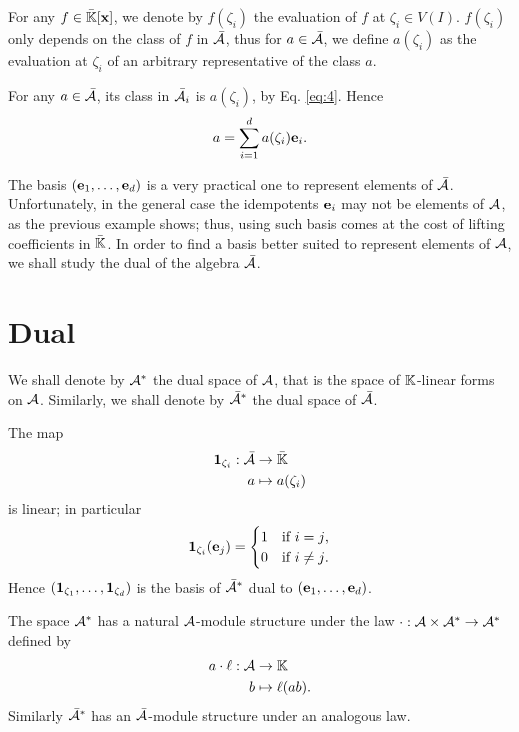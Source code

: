 For any $f\in\bar{\mathbb{K}}[\mathbf{x}]$, we denote by $f(\zeta_i)$ the
evaluation of $f$ at $\zeta_i\in V(I)$. $f(\zeta_i)$ only depends on
the class of $f$ in $\mathcal{\bar{A}}$, thus for
$a\in\bar{\mathcal{A}}$, we define $a(\zeta_i)$ as the evaluation at
$\zeta_i$ of an arbitrary representative of the class $a$.

For any $a\in\bar{\mathcal{A}}$, its class in $\bar{\mathcal{A}}_i$ is $a(\zeta_i)$,
by Eq. \eqref{eq:4}. Hence
\begin{equation}
  \label{eq:2}
  a = \sum_{i=1}^da(\zeta_i)\mathbf{e}_i
  \text{.}
\end{equation}

The basis $(\mathbf{e}_1,\ldots,\mathbf{e}_d)$ is a very practical one
to represent elements of $\bar{\mathcal{A}}$. Unfortunately, in the
general case the idempotents $\mathbf{e}_i$ may not be elements of
$\mathcal{A}$, as the previous example shows; thus, using such basis
comes at the cost of lifting coefficients in $\bar{\mathbb{K}}$. In order to
find a basis better suited to represent elements of $\mathcal{A}$, we
shall study the dual of the algebra $\bar{\mathcal{A}}$.


\section{Dual}
\label{sec:dual}
We shall denote by $\mathcal{A}^\ast$ the dual space of $\mathcal{A}$,
that is the space of $\mathbb{K}$-linear forms on $\mathcal{A}$. Similarly, we
shall denote by $\bar{\mathcal{A}}^\ast$ the dual space of
$\bar{\mathcal{A}}$.

The map
\begin{equation}
  \label{eq:8}
  \begin{aligned}
  \mathbf{1}_{\zeta_i} : \bar{\mathcal{A}} &\rightarrow \bar{\mathbb{K}}\\
  a &\mapsto a(\zeta_i)
  \end{aligned}
\end{equation}
is linear; in particular
\begin{equation}
  \label{eq:9}
  \mathbf{1}_{\zeta_i}(\mathbf{e}_j) =
  \begin{cases}
    1 &\text{if $i=j$,}\\
    0 &\text{if $i\ne j$.}
  \end{cases}
\end{equation}
Hence $(\mathbf{1}_{\zeta_1},\ldots,\mathbf{1}_{\zeta_d})$ is the basis
of $\bar{\mathcal{A}}^\ast$ dual to $(\mathbf{e}_1,\ldots,\mathbf{e}_d)$.

The space $\mathcal{A}^\ast$ has a natural $\mathcal{A}$-module
structure under the law
$\cdot:\mathcal{A}\times\mathcal{A}^\ast\rightarrow\mathcal{A}^\ast$ defined by
\begin{equation}
  \label{eq:10}
  \begin{aligned}
    a\cdot\ell : \mathcal{A} &\rightarrow \mathbb{K}\\
    b &\mapsto \ell(ab)
    \text{.}
  \end{aligned}
\end{equation}
Similarly $\bar{\mathcal{A}}^\ast$ has an $\bar{\mathcal{A}}$-module
structure under an analogous law.


